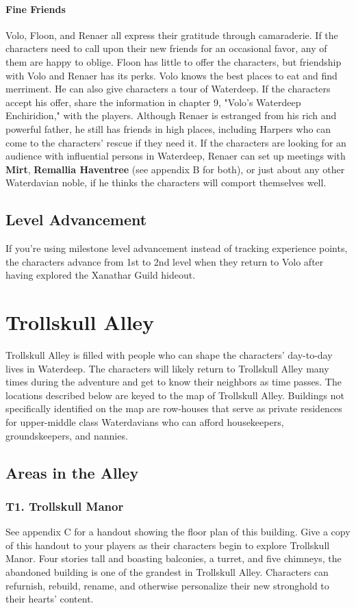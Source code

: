\documentclass[10pt,a4paper,twoside,twocolumn,openany,nodeprecatedcode]{dndbook}
\begin{document}
\subsubsection{Fine Friends}
Volo, Floon, and Renaer all express their gratitude through camaraderie. If the characters need to call upon their new friends for an occasional favor, any of them are happy to oblige. Floon has little to offer the characters, but friendship with Volo and Renaer has its perks.
Volo knows the best places to eat and find merriment. He can also give characters a tour of Waterdeep. If the characters accept his offer, share the information in chapter 9, "Volo's Waterdeep Enchiridion," with the players.
Although Renaer is estranged from his rich and powerful father, he still has friends in high places, including Harpers who can come to the characters' rescue if they need it. If the characters are looking for an audience with influential persons in Waterdeep, Renaer can set up meetings with \textbf{Mirt}, \textbf{Remallia Haventree} (see appendix B for both), or just about any other Waterdavian noble, if he thinks the characters will comport themselves well.
\section{Level Advancement}
If you're using milestone level advancement instead of tracking experience points, the characters advance from 1st to 2nd level when they return to Volo after having explored the Xanathar Guild hideout.
\chapter{Trollskull Alley}
Trollskull Alley is filled with people who can shape the characters' day-to-day lives in Waterdeep. The characters will likely return to Trollskull Alley many times during the adventure and get to know their neighbors as time passes.
The locations described below are keyed to the map of Trollskull Alley. Buildings not specifically identified on the map are row-houses that serve as private residences for upper-middle class Waterdavians who can afford housekeepers, groundskeepers, and nannies.
\section{Areas in the Alley}
\subsection{T1. Trollskull Manor}
See appendix C for a handout showing the floor plan of this building. Give a copy of this handout to your players as their characters begin to explore Trollskull Manor.
Four stories tall and boasting balconies, a turret, and five chimneys, the abandoned building is one of the grandest in Trollskull Alley. Characters can refurnish, rebuild, rename, and otherwise personalize their new stronghold to their hearts' content.
\end{document}
